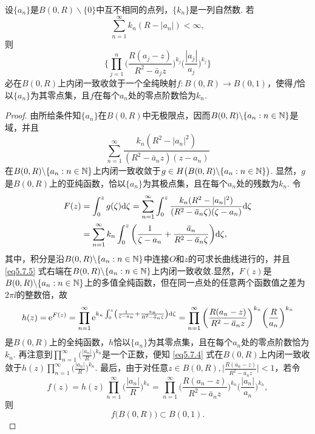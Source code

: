 \begin{theorem}\label{thm5.7.4}
设$\{a_n\}$是$B(0,R)\backslash\{0\}$中互不相同的点列，$\{k_n\}$是一列自然数. 若
\[\sum_{n=1}^\infty k_n(R-|a_n|)<\infty,\]
则
\begin{equation}\label{eq5.7.4}
\bigg\{\prod_{j=1}^n\bigg(\frac{R(a_j-z)}{R^2-\bar a_jz}\bigg)^{k_j}
\bigg(\frac{|a_j|}{a_j}\bigg)^{k_j}\bigg\}
\end{equation}
必在$B(0,R)$上内闭一致收敛于一个全纯映射$f:B(0,R)\to B(0,1)$，使得$f$恰以$\{a_n\}$为其零点集，且$f$在每个$a_n$处的零点阶数恰为$k_n$.
\end{theorem}
\begin{proof}
由所给条件知$\{a_n\}$在$B(0,R)$中无极限点，因而$B(0,R)\backslash\{a_n:n\in\MN\}$是域，并且
\[\sum_{n=1}^\infty\frac{k_n(R^2-|a_n|^2)}{(R^2-\bar a_nz)(z-a_n)}\]
在$B(0,R)\backslash\{a_n:n\in\MN\}$上内闭一致收敛于$g\in H\big(B(0,R)\backslash
\{a_n:n\in\MN\}\big)$. 显然，$g$是$B(0,R)$上的亚纯函数，恰以$\{a_n\}$为其极点集，且在每个$a_n$处的残数为$k_n$. 令
\begin{equation}\label{eq5.7.5}
\begin{aligned}
F(z)&=\int_0^zg(\zeta)\textrm d\zeta=\sum_{n=1}^\infty\int_0^z
\frac{k_n(R^2-|a_n|^2)}{(R^2-\bar a_n\zeta)(\zeta-a_n)}\textrm d\zeta\\
&=\sum_{n=1}^\infty k_n\int_0^z\bigg(\frac1{\zeta-a_n}+\frac{\bar a_n}{R^2
-\bar a_n\zeta}\bigg)\textrm d\zeta,
\end{aligned}
\end{equation}
其中，积分是沿$B(0,R)\backslash\{a_n:n\in\MN\}$中连接$O$和$z$的可求长曲线进行的，并且 \eqref{eq5.7.5} 式右端在$B(0,R)\backslash\{a_n:n\in\MN\}$上内闭一致收敛.显然，$F(z)$是$B(0,R)\backslash\{a_n:n\in\MN\}$上的多值全纯函数，但在同一点处的任意两个函数值之差为$2\pi\ii$的整数倍，故
\[h(z)=\ee^{F(z)}=\prod_{n=1}^\infty\ee^{k_n\int_0^z\left(\frac1{\zeta-a_n}
+\frac{a_n}{R^2-\bar a_n\zeta}\right)\textrm d\zeta}
=\prod_{n=1}^\infty\bigg(\frac{R(a_n-z)}{R^2-\bar a_nz}\bigg)^{k_n}
\bigg(\frac{R}{a_n}\bigg)^{k_n}\]
是$B(0,R)$上的全纯函数，$h$恰以$\{a_n\}$为其零点集，且在每个$a_n$处的零点阶数恰为$k_n$. 再注意到$\prod_{n=1}^\infty\bigg(\frac{|a_n|}{R}\bigg)^{k_n}$是一个正数，便知 \eqref{eq5.7.4} 式在$B(0,R)$上内闭一致收敛于$h(z)\prod_{n=1}^\infty\bigg(\frac{|a_n|}{R}\bigg)^{k_n}$. 最后，由于对任意$z\in B(0,R),\bigg|\frac{R(a_n-z)}{R^2-\bar a_nz}\bigg|<1$，若令
\[f(z)=h(z)\prod_{n=1}^\infty\bigg(\frac{|a_n|}{R}\bigg)^{k_n}
=\prod_{n=1}^\infty\bigg(\frac{R(a_n-z)}{R^2-\bar a_nz}\bigg)^{k_n}
\bigg(\frac{|a_n|}{a_n}\bigg)^{k_n},\]
则
\begin{equation*}
f\big(B(0,R)\big)\subset B(0,1).
\end{equation*}
\end{proof}

